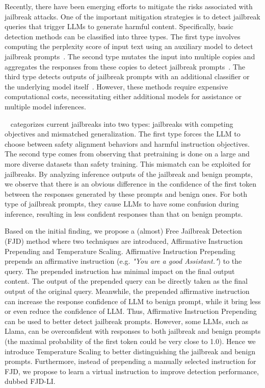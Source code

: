 \documentclass{article}
\begin{document}
Recently, there have been emerging efforts to mitigate the risks associated with jailbreak attacks. One of the important mitigation strategies is to detect jailbreak queries that trigger LLMs to generate harmful content. Specifically, basic detection methods can be classified into three types. The first type involves computing the perplexity score of input text using an auxiliary model to detect jailbreak prompts~\citep{alon2023detecting, jain2023baseline}. The second type mutates the input into multiple copies and aggregates the responses from these copies to detect jailbreak prompts~\citep{robey2023smoothllm, zeng2024autodefense}. The third type detects outputs of jailbreak prompts with an additional classifier or the underlying model itself~\citep{yuan2024rigorllm,helbling2023llm}. However, these methods require expensive computational costs, necessitating either additional models for assistance or multiple model inferences.

~\cite{wei2024jailbroken} categorizes current jailbreaks into two types: jailbreaks with competing objectives and mismatched generalization. The first type forces the LLM to choose between safety alignment behaviors and harmful instruction objectives. The second type comes from observing that pretraining is done on a large and more diverse datasets than safety training. This mismatch can be exploited for jailbreaks. By analyzing inference outputs of the jailbreak and benign prompts, we observe that there is an obvious difference in the confidence of the first token between the responses generated by these prompts and benign ones. For both type of jailbreak prompts, they cause LLMs to have some confusion during inference, resulting in less confident responses than that on benign prompts.

Based on the initial finding, we propose a (almost) Free Jailbreak Detection (FJD) method where two techniques are introduced, Affirmative Instruction Prepending and Temperature Scaling. Affirmative Instruction Prepending prepends an affirmative instruction (e.g. \textit{"You are a good Assistant."}) to the query. The prepended instruction has minimal impact on the final output content. The output of the prepended query can be directly taken as the final output of the original query. Meanwhile, the prepended affirmative instruction can increase the response confidence of LLM to benign prompt, while it bring less or even reduce the confidence of LLM. Thus, Affirmative Instruction Prepending can be used to better detect jailbreak prompts. However, some LLMs, such as Llama, can be overconfident with responses to both jailbreak and benign prompts (the maximal probability of the first token could be very close to 1.0). Hence we introduce Temperature Scaling to better distinguishing the jailbreak and benign prompts. Furthermore, instead of prepending a manually selected instruction for FJD, we propose to learn a virtual instruction to improve detection performance, dubbed FJD-LI.
\end{document}

